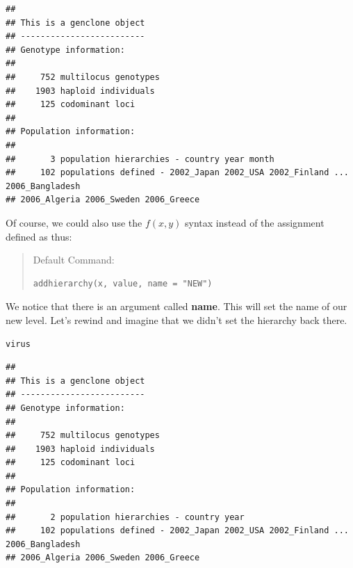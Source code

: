 \documentclass[letterpaper]{article}\usepackage[]{graphicx}\usepackage[]{color}
\makeatletter
\newcommand{\hlstd}[1]{\textcolor[rgb]{0,0,0}{#1}}%
\newenvironment{kframe}{%
 \def\at@end@of@kframe{}%
 \ifinner\ifhmode%
  \def\at@end@of@kframe{\end{minipage}}%
  \begin{minipage}{\columnwidth}%
 \fi\fi%
 \def\FrameCommand##1{\hskip\@totalleftmargin \hskip-\fboxsep
 \colorbox{shadecolor}{##1}\hskip-\fboxsep
     \hskip-\linewidth \hskip-\@totalleftmargin \hskip\columnwidth}%
 \MakeFramed {\advance\hsize-\width
   \@totalleftmargin\z@ \linewidth\hsize
   \@setminipage}}%
 {\par\unskip\endMakeFramed%
 \at@end@of@kframe}
\newenvironment{knitrout}{}{} %
\makeatother
\begin{document}
\begin{knitrout}\footnotesize
{}\color{fgcolor}\begin{kframe}
\begin{verbatim}
## 
## This is a genclone object
## -------------------------
## Genotype information:
## 
##     752 multilocus genotypes
##    1903 haploid individuals
##     125 codominant loci
## 
## Population information:
## 
##       3 population hierarchies - country year month
##     102 populations defined - 2002_Japan 2002_USA 2002_Finland ... 2006_Bangladesh 
## 2006_Algeria 2006_Sweden 2006_Greece
\end{verbatim}
\end{kframe}
\end{knitrout}


Of course, we could also use the $f(x, y)$ syntax instead of the assignment 
defined as thus:
\begin{quote}
Default Command:
\begin{knitrout}
\color{fgcolor}\begin{kframe}
\begin{verbatim}
addhierarchy(x, value, name = "NEW")
\end{verbatim}
\end{kframe}
\end{knitrout}

\end{quote}
We notice that there is an argument called \textbf{name}. This will set the name
of our new level. Let's rewind and imagine that we didn't set the hierarchy back
there.
\begin{knitrout}\footnotesize
{}\color{fgcolor}\begin{kframe}
\begin{alltt}
\hlstd{virus}
\end{alltt}
\begin{verbatim}
## 
## This is a genclone object
## -------------------------
## Genotype information:
## 
##     752 multilocus genotypes
##    1903 haploid individuals
##     125 codominant loci
## 
## Population information:
## 
##       2 population hierarchies - country year
##     102 populations defined - 2002_Japan 2002_USA 2002_Finland ... 2006_Bangladesh 
## 2006_Algeria 2006_Sweden 2006_Greece
\end{verbatim}
\end{kframe}
\end{knitrout}
\end{document}
